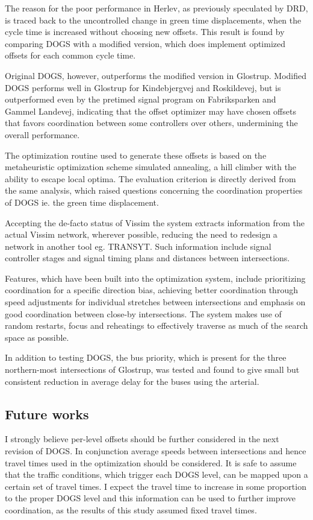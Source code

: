 The reason for the poor performance in Herlev, as previously speculated by DRD, is traced back to the uncontrolled change in green time displacements, when the cycle time is increased without choosing new offsets. This result is found by comparing DOGS with a modified version, which does implement optimized offsets for each common cycle time. 

Original DOGS, however, outperforms the modified version in Glostrup. Modified DOGS performs well in Glostrup for Kindebjergvej and Roskildevej, but is outperformed even by the pretimed signal program on Fabriksparken and Gammel Landevej, indicating that the offset optimizer may have chosen offsets that favors coordination between some controllers over others, undermining the overall performance.

The optimization routine used to generate these offsets is based on the metaheuristic optimization scheme simulated annealing, a hill climber with the ability to escape local optima. The evaluation criterion is directly derived from the same analysis, which raised questions concerning the coordination properties of DOGS ie. the green time displacement.

Accepting the de-facto status of Vissim the system extracts information from the actual Vissim network, wherever possible, reducing the need to redesign a network in another tool eg. TRANSYT. Such information include signal controller stages and signal timing plans and distances between intersections.

Features, which have been built into the optimization system, include prioritizing coordination for a specific direction bias, achieving better coordination through speed adjustments for individual stretches between intersections and emphasis on good coordination between close-by intersections. The system makes use of random restarts, focus and reheatings to effectively traverse as much of the search space as possible.

In addition to testing DOGS, the bus priority, which is present for the three northern-most intersections of Glostrup, was tested and found to give small but consistent reduction in average delay for the buses using the arterial.

\subsection{Future works}
I strongly believe per-level offsets should be further considered in the next revision of DOGS. In conjunction average speeds between intersections and hence travel times used in the optimization should be considered. It is safe to assume that the traffic conditions, which trigger each DOGS level, can be mapped upon a certain set of travel times. I expect the travel time to increase in some proportion to the proper DOGS level and this information can be used to further improve coordination, as the results of this study assumed fixed travel times.

